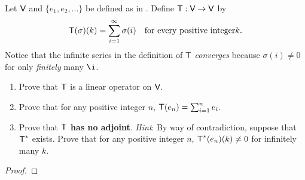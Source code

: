 \begin{exercise} \label{exercise 6.3.24}
Let \(\textsf{V}\) and \(\{ e_1, e_2, ... \}\) be defined as in .
Define \(\textsf{T} : \textsf{V} \to \textsf{V}\) by
\[
    \textsf{T}(\sigma)(k) = \sum_{i = 1}^{\infty} \sigma(i) \quad  \text{for every positive integer} k.
\]
Notice that the infinite series in the definition of \(\textsf{T}\) \emph{converges} because \(\sigma(i) \ne 0\) for only \emph{finitely} many \(\i\).
\begin{enumerate}
\item Prove that \(\textsf{T}\) is a linear operator on \(\textsf{V}\).
\item Prove that for any positive integer \(n\), \(\textsf{T}(e_n) = \sum_{i = 1}^n e_i.\)
\item Prove that \textbf{\(\textsf{T}\) has no adjoint}.
\emph{Hint}: By way of contradiction, suppose that \(\textsf{T}^*\) exists.
Prove that for any positive integer \(n\), \(\textsf{T}^*(e_n)(k) \ne 0\) for infinitely many \(k\).
\end{enumerate}
\end{exercise}

\begin{proof}
\end{proof}
